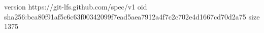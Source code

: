 version https://git-lfs.github.com/spec/v1
oid sha256:bca80f91af5c6c63f00342099f7ead5aea7912a4f7c2c702e4d1667cd70d2a75
size 1375
